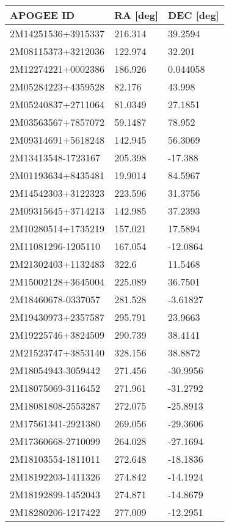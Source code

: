\documentclass[fleqn,usenatbib]{mnras}
\begin{document}
\begin{table}
\centering
  \begin{tabular}{lll}
  \toprule
  APOGEE ID  &       RA [deg] &       DEC [deg]                                     \\
  \midrule
2M14251536+3915337 &  216.314 &   39.2594 \\
2M08115373+3212036 &  122.974 &    32.201 \\
2M12274221+0002386 &  186.926 &  0.044058 \\
2M05284223+4359528 &   82.176 &    43.998 \\
2M05240837+2711064 &  81.0349 &   27.1851 \\
2M03563567+7857072 &  59.1487 &    78.952 \\
2M09314691+5618248 &  142.945 &   56.3069 \\
2M13413548-1723167 &  205.398 &   -17.388 \\
2M01193634+8435481 &  19.9014 &   84.5967 \\
2M14542303+3122323 &  223.596 &   31.3756 \\
2M09315645+3714213 &  142.985 &   37.2393 \\
2M10280514+1735219 &  157.021 &   17.5894 \\
2M11081296-1205110 &  167.054 &  -12.0864 \\
2M21302403+1132483 &    322.6 &   11.5468 \\
2M15002128+3645004 &  225.089 &   36.7501 \\
2M18460678-0337057 &  281.528 &  -3.61827 \\
2M19430973+2357587 &  295.791 &   23.9663 \\
2M19225746+3824509 &  290.739 &   38.4141 \\
2M21523747+3853140 &  328.156 &   38.8872 \\
2M18054943-3059442 &  271.456 &  -30.9956 \\
2M18075069-3116452 &  271.961 &  -31.2792 \\
2M18081808-2553287 &  272.075 &  -25.8913 \\
2M17561341-2921380 &  269.056 &  -29.3606 \\
2M17360668-2710099 &  264.028 &  -27.1694 \\
2M18103554-1811011 &  272.648 &  -18.1836 \\
2M18192203-1411326 &  274.842 &  -14.1924 \\
2M18192899-1452043 &  274.871 &  -14.8679 \\
2M18280206-1217422 &  277.009 &  -12.2951 \\

\end{tabular}
\end{table}
\end{document}
